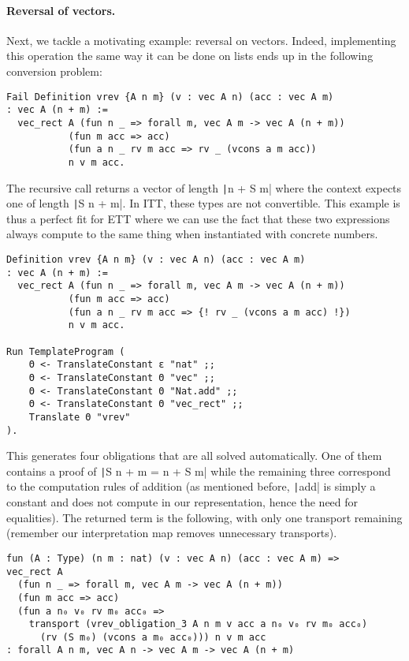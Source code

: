 \paragraph{Reversal of vectors.}
%
Next, we tackle a motivating example: reversal on vectors.
Indeed, implementing this operation the same way it can
be done on lists ends up in the following conversion problem:
%
\begin{verbatim}
Fail Definition vrev {A n m} (v : vec A n) (acc : vec A m)
: vec A (n + m) :=
  vec_rect A (fun n _ => forall m, vec A m -> vec A (n + m))
           (fun m acc => acc)
           (fun a n _ rv m acc => rv _ (vcons a m acc))
           n v m acc.
\end{verbatim}
%
The recursive call returns a vector of length \texttt|n + S m|
where the context expects one of length \texttt|S n + m|. In ITT, these
types are not convertible. This example is thus a perfect fit for ETT where we
can use the fact that these two expressions always compute to the same thing
when instantiated with concrete numbers.
%
\begin{verbatim}
Definition vrev {A n m} (v : vec A n) (acc : vec A m)
: vec A (n + m) :=
  vec_rect A (fun n _ => forall m, vec A m -> vec A (n + m))
           (fun m acc => acc)
           (fun a n _ rv m acc => {! rv _ (vcons a m acc) !})
           n v m acc.

Run TemplateProgram (
    Θ <- TranslateConstant ε "nat" ;;
    Θ <- TranslateConstant Θ "vec" ;;
    Θ <- TranslateConstant Θ "Nat.add" ;;
    Θ <- TranslateConstant Θ "vec_rect" ;;
    Translate Θ "vrev"
).
\end{verbatim}
%
This generates four obligations that are all solved automatically. One of
them contains a proof of \texttt|S n + m = n + S m| while the remaining
three correspond to the computation rules of addition (as mentioned before,
\texttt|add| is simply a constant and does not compute in our
representation, hence the need for equalities).
%
The returned term is the following, with only one transport remaining
(remember our interpretation map removes unnecessary transports).
\begin{verbatim}
fun (A : Type) (n m : nat) (v : vec A n) (acc : vec A m) =>
vec_rect A
  (fun n _ => forall m, vec A m -> vec A (n + m))
  (fun m acc => acc)
  (fun a n₀ v₀ rv m₀ acc₀ =>
    transport (vrev_obligation_3 A n m v acc a n₀ v₀ rv m₀ acc₀)
      (rv (S m₀) (vcons a m₀ acc₀))) n v m acc
: forall A n m, vec A n -> vec A m -> vec A (n + m)
\end{verbatim}

